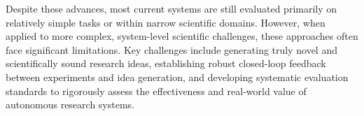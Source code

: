 Despite these advances, most current systems are still evaluated primarily on relatively simple tasks or within narrow scientific domains. However, when applied to more complex, system-level scientific challenges, these approaches often face significant limitations. Key challenges include generating truly novel and scientifically sound research ideas, establishing robust closed-loop feedback between experiments and idea generation, and developing systematic evaluation standards to rigorously assess the effectiveness and real-world value of autonomous research systems.